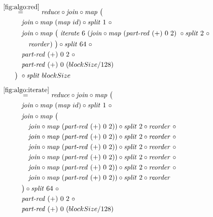 \begin{align*}
%
  &\hspace{-2em}\quad\begin{aligned}
    &\overset{\ref{fig:algo:red}}{=\hspace{.2em}}
      \reduce \circ \join \circ \map\ \big(\\
    &\qquad\quad\join \circ \map\ (\map\ id) \circ \splitN\ 1\ \circ\\
    &\qquad\quad\join \circ \map\ \big(\ \iterateN\ 6\ (\join \circ \map\ (\partRed\ (+)\ 0\ 2)\ \circ \splitN\ 2\ \circ\\
    &\qquad\qquad\reorder)\ \big)\circ \splitN\ 64\ \circ\\
    &\qquad\quad\partRed\ (+)\ 0\ 2\ \circ \\
    &\qquad\quad\partRed\ (+)\ 0\ (blockSize/128)\\
    &\qquad\big)\ \circ \splitN\ blockSize
  \end{aligned}\\[.5em]
%
  &\hspace{-2em}\quad\begin{aligned}
    &\overset{\ref{fig:algo:iterate}}{=\hspace{.2em}}
      \reduce \circ \join \circ \map\ \big(\\
    &\qquad\quad\join \circ \map\ (\map\ id) \circ \splitN\ 1\ \circ\\
    &\qquad\quad\join \circ \map\ \big(\\
    &\qquad\qquad \join \circ \map\ (\partRed\ (+)\ 0\ 2))\circ \splitN\ 2 \circ \reorder\ \circ\\
    &\qquad\qquad \join \circ \map\ (\partRed\ (+)\ 0\ 2))\circ \splitN\ 2 \circ \reorder\ \circ\\
    &\qquad\qquad \join \circ \map\ (\partRed\ (+)\ 0\ 2))\circ \splitN\ 2 \circ \reorder\ \circ\\
    &\qquad\qquad \join \circ \map\ (\partRed\ (+)\ 0\ 2))\circ \splitN\ 2 \circ \reorder\ \circ\\
    &\qquad\qquad \join \circ \map\ (\partRed\ (+)\ 0\ 2))\circ \splitN\ 2 \circ \reorder\ \circ\\
    &\qquad\qquad \join \circ \map\ (\partRed\ (+)\ 0\ 2))\circ \splitN\ 2 \circ \reorder\\
    &\qquad\quad\big)\circ \splitN\ 64\ \circ\\
    &\qquad\quad\partRed\ (+)\ 0\ 2\ \circ \\
    &\qquad\quad\partRed\ (+)\ 0\ (blockSize/128)\\

\end{aligned}
\end{align*}
